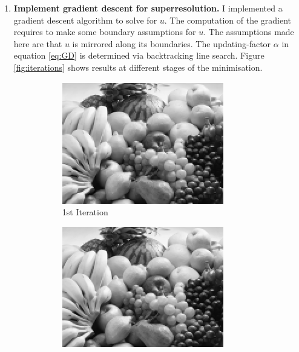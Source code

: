 \documentclass{paper}
\begin{document}
\begin{enumerate}
\item \textbf{Implement gradient descent for superresolution.} 
I implemented a gradient descent algorithm to solve for $u$. The computation of the gradient requires to make some boundary assumptions for $u$. The assumptions made here are that $u$ is mirrored along its boundaries. The updating-factor $\alpha$ in equation \ref{eq:GD} is determined via backtracking line search. Figure \ref{fig:iterations} shows results at different stages of the minimisation.
\begin{figure}[]
\begin{center}
	\begin{subfigure}[b]{0.49\textwidth}
                \includegraphics[width=\textwidth]{it1}
                \caption{1st Iteration}
        \end{subfigure}
        	\begin{subfigure}[b]{0.49\textwidth}
                \includegraphics[width=\textwidth]{it600}

\end{subfigure}
\end{center}
\end{figure}
\end{enumerate}
\end{document}
